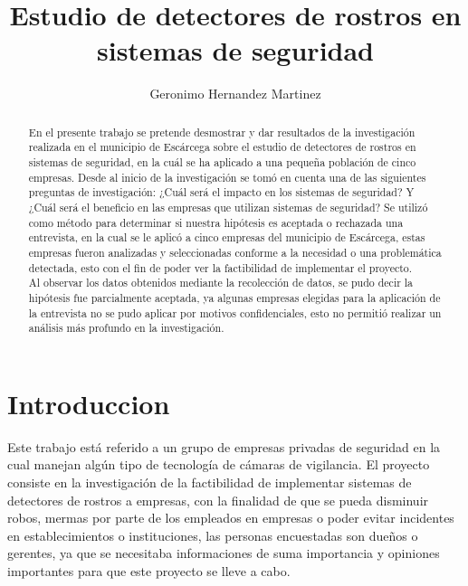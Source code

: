 \documentclass{comjnl}
\begin{document}
\title[ARTICULO DE INVESTIGACION]{Estudio de detectores de rostros en sistemas de seguridad}

\author{Geronimo Hernandez Martinez}

 





\begin{abstract}
En el presente trabajo  se pretende desmostrar y dar resultados de la investigación realizada en el municipio de Escárcega sobre el estudio de detectores de rostros en sistemas de seguridad, en la cuál se ha aplicado a una pequeña población de cinco empresas. Desde al inicio de la investigación se tomó en cuenta una de las siguientes  preguntas de investigación: ¿Cuál será el impacto en los sistemas de seguridad? Y ¿Cuál será el beneficio en las empresas que utilizan sistemas de seguridad?
Se utilizó como método para determinar si nuestra hipótesis es aceptada o rechazada una entrevista, en la cual se le aplicó a cinco empresas del municipio de Escárcega, estas empresas fueron analizadas y seleccionadas conforme a la necesidad o una problemática detectada, esto con el fin de poder ver la factibilidad de implementar el proyecto.\\
Al observar los datos obtenidos mediante la recolección de datos, se pudo decir la hipótesis fue parcialmente aceptada, ya algunas empresas elegidas para la aplicación de la entrevista no se pudo aplicar por motivos confidenciales, esto no permitió realizar un análisis más profundo en la investigación.\\


\end{abstract}

\maketitle


\section{Introduccion}

Este trabajo está referido a un grupo de empresas privadas de seguridad en la cual manejan algún tipo de tecnología  de cámaras de vigilancia. El proyecto consiste en la investigación de la factibilidad de implementar sistemas de detectores de rostros a empresas, con la finalidad de que se pueda disminuir robos, mermas por parte de los empleados en empresas o poder evitar incidentes en establecimientos o instituciones, las personas encuestadas son dueños o gerentes, ya que se necesitaba informaciones de suma importancia y opiniones importantes para que este proyecto se lleve a cabo.
\end{document}
